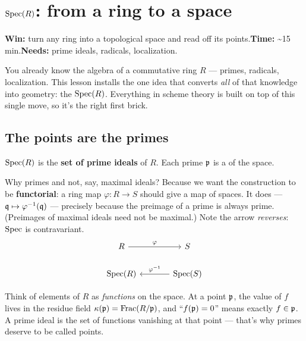 \chapter{$\operatorname{Spec}(R)$: from a ring to a space}\label{ch:ch01-spec}

\noindent\textbf{Win:} turn any ring into a topological space and read off its
points.\quad\textbf{Time:} \textasciitilde15 min.\quad\textbf{Needs:} prime
ideals, radicals, localization.

\medskip

You already know the algebra of a commutative ring $R$ --- primes, radicals,
localization. This lesson installs the one idea that converts \emph{all} of that
knowledge into geometry: the  $\operatorname{Spec}(R)$. Everything in scheme
theory is built on top of this single move, so it's the right first
brick.

\section{The points are the primes}

\begin{defbox}
$\operatorname{Spec}(R)$ is the \textbf{set of prime ideals} of $R$. Each prime $\mathfrak{p}$ is a
 of the space.
\end{defbox}

Why primes and not, say, maximal ideals? Because we want the construction to be
\textbf{functorial}: a ring map $\varphi\colon R\to S$ should give a map of
spaces. It does --- $\mathfrak{q}\mapsto \varphi^{-1}(\mathfrak{q})$ --- precisely because the
preimage of a prime is always prime. (Preimages of maximal ideals need not be
maximal.) Note the arrow \emph{reverses}:
$\operatorname{Spec}$ is contravariant.
\[
\begin{tikzcd}[column sep=large]
R \arrow[r, "\varphi"] & S \\
\Spec(R) & \Spec(S) \arrow[l, "\varphi^{-1}"']
\end{tikzcd}
\]

\begin{intubox}
Think of elements of $R$ as \emph{functions} on the space. At a point $\mathfrak{p}$, the
value of $f$ lives in the residue field $\kappa(\mathfrak{p})=\operatorname{Frac}(R/\mathfrak{p})$, and
``$f(\mathfrak{p})=0$'' means exactly $f\in\mathfrak{p}$. A prime ideal is the set of functions
vanishing at that point --- that's why primes deserve to be called points.
\end{intubox}

